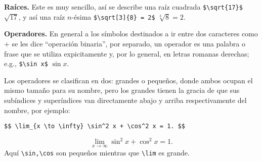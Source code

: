 \textbf{Raíces.} Este es muy sencillo, así se describe una raíz cuadrada \lstinline|$\sqrt{17}$| $\sqrt{17}$, y así una raíz $n$-ésima \lstinline|$\sqrt[3]{8} = 2$| $\sqrt[3]{8} = 2$.

\textbf{Operadores.} En general a los símbolos destinados a ir entre dos caracteres como + se les dice ``operación binaria'', por separado, un operador es una palabra o frase que se utiliza expicitamente y, por lo general, en letras romanas derechas; e.g., \lstinline|$\sin x$| $\sin x$.

Los operadores se clasifican en dos: grandes o pequeños, donde ambos ocupan el mismo tamaño para su nombre, pero los grandes tienen la gracia de que sus subíndices y superíndices van directamente abajo y arriba respectivamente del nombre, por ejemplo:
\begin{lstlisting}
$$ \lim_{x \to \infty} \sin^2 x + \cos^2 x = 1. $$
\end{lstlisting}
$$ \lim_{x \to \infty} \sin^2 x + \cos^2 x = 1. $$
Aquí \lstinline|\sin,\cos| son pequeños mientras que \lstinline|\lim| es grande.

